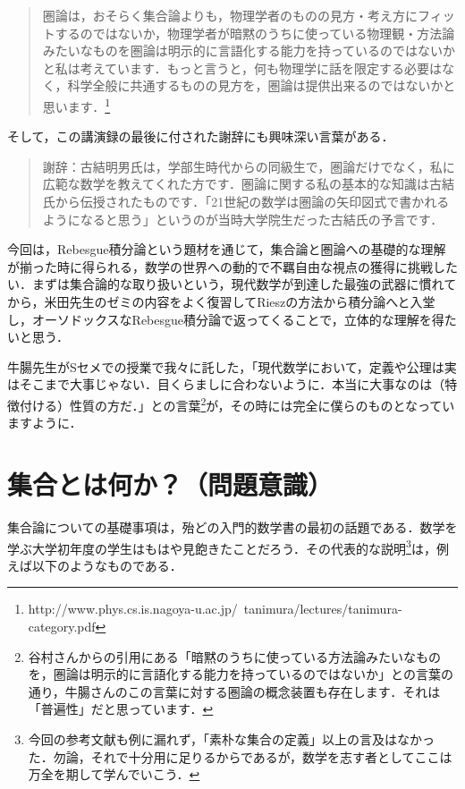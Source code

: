 \documentclass[uplatex, 12pt, a4paper, dvipdfmx]{jsarticle}
\begin{document}
\begin{quote}
圏論は，おそらく集合論よりも，物理学者のものの見方・考え方にフィットするのではないか，物理学者が暗黙のうちに使っている物理観・方法論みたいなものを圏論は明示的に言語化する能力を持っているのではないかと私は考えています．もっと言うと，何も物理学に話を限定する必要はなく，科学全般に共通するものの見方を，圏論は提供出来るのではないかと思います．\footnote{http://www.phys.cs.is.nagoya-u.ac.jp/~tanimura/lectures/tanimura-category.pdf}
\end{quote}

そして，この講演録の最後に付された謝辞にも興味深い言葉がある．

\begin{quote}
	謝辞：古結明男氏は，学部生時代からの同級生で，圏論だけでなく，私に広範な数学を教えてくれた方です．圏論に関する私の基本的な知識は古結氏から伝授されたものです．「21世紀の数学は圏論の矢印図式で書かれるようになると思う」というのが当時大学院生だった古結氏の予言です．
\end{quote}

今回は，Rebesgue積分論という題材を通じて，集合論と圏論への基礎的な理解が揃った時に得られる，数学の世界への動的で不羈自由な視点の獲得に挑戦したい．まずは集合論的な取り扱いという，現代数学が到達した最強の武器に慣れてから，米田先生のゼミの内容をよく復習してRieszの方法から積分論へと入堂し，オーソドックスなRebesgue積分論で返ってくることで，立体的な理解を得たいと思う．\par


牛腸先生がSセメでの授業で我々に託した，「現代数学において，定義や公理は実はそこまで大事じゃない．目くらましに合わないように．本当に大事なのは（特徴付ける）性質の方だ．」との言葉\footnote{谷村さんからの引用にある「暗黙のうちに使っている方法論みたいなものを，圏論は明示的に言語化する能力を持っているのではないか」との言葉の通り，牛腸さんのこの言葉に対する圏論の概念装置も存在します．それは「普遍性」だと思っています．}が，その時には完全に僕らのものとなっていますように．

\section{集合とは何か？（問題意識）}

集合論についての基礎事項は，殆どの入門的数学書の最初の話題である．数学を学ぶ大学初年度の学生はもはや見飽きたことだろう．その代表的な説明\footnote{今回の参考文献\cite{吉田洋一}\cite{須之内治男}も例に漏れず，「素朴な集合の定義」以上の言及はなかった．勿論，それで十分用に足りるからであるが，数学を志す者としてここは万全を期して学んでいこう．}は，例えば以下のようなものである．
\end{document}
